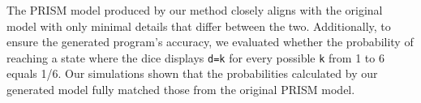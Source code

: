The PRISM model produced by our method closely aligns with the original model with only minimal details that differ between the two.
Additionally, to ensure the generated program's accuracy, 
we evaluated whether the probability of reaching a state where the dice displays \texttt{d=k} for every possible \texttt{k} from 1 to 6 equals 1/6. Our simulations shown that the probabilities calculated by our generated model fully matched those from the original PRISM model. 

\begin{comment}
\subsection{Simple Peer-To-Peer Protocol}
This case study describes a simple peer-to-peer protocol based on BitTorrent\footnote{\url{https://www.prismmodelchecker.org/casestudies/peer2peer.php}}. The model comprises a set of clients trying to download a file that has been partitioned into $K$ blocks. Initially, there is one client that has already obtained all of the blocks and $N$ additional clients with no blocks. Each client can download a block from any of the others but they can only attempt four concurrent downloads for each block.\\
The code we analyze with $k=5$ and $N=4$ is reported in Listing \ref{ex2-code}.
\begin{lstlisting}[style=chor-color,caption={Choreography for the Peer-To-Peer Protocol.},captionpos=b,label={ex2-code}]
preamble
"ctmc"
"const double mu=2;"
"formula rate1=mu*(1+min(3,b11+b21+b31+b41));"
"formula rate2=mu*(1+min(3,b12+b22+b32+b42));"
"formula rate3=mu*(1+min(3,b13+b23+b33+b43));"
"formula rate4=mu*(1+min(3,b14+b24+b34+b44));"
"formula rate5=mu*(1+min(3,b15+b25+b35+b45));"
endpreamble

n = 4;
n = 4;

Client[i] $\rightarrow$ i in [1...n]
Client[i] : "b[i]1 : [0..1];", "b[i]2 : [0..1];", "b[i]3 : [0..1];", "b[i]4 : [0..1];", "b[i]5 : [0..1];" ;

{
PeerToPeer := Client[i] $\rightarrow$ Client[i]: 
			(+["rate1*1"]  "(b[i]1'=1)"$\&\&$" " . PeerToPeer
			 +["rate2*1"]  "(b[i]2'=1)"$\&\&$" " . PeerToPeer
			 +["rate3*1"]  "(b[i]3'=1)"$\&\&$" " . PeerToPeer
			 +["rate4*1"]  "(b[i]4'=1)"$\&\&$" " . PeerToPeer
			 +["rate5*1"]  "(b[i]5'=1)"$\&\&$" " . PeerToPeer)
}
	
\end{lstlisting}

Part of the generated PRISM code is shown in Listing \ref{ex2-gen} and it is faithful with what reported in the PRISM documentation. 
\begin{lstlisting}[style=prism-color,caption={Generated PRISM program for the Peer-To-Peer Protocol.},captionpos=b,label={ex2-gen}]
ctmc
const double mu=2;
formula rate1=mu*(1+min(3,b11+b21+b31+b41));
formula rate2=mu*(1+min(3,b12+b22+b32+b42));
formula rate3=mu*(1+min(3,b13+b23+b33+b43));
formula rate4=mu*(1+min(3,b14+b24+b34+b44));
formula rate5=mu*(1+min(3,b15+b25+b35+b45));


\end{comment}
